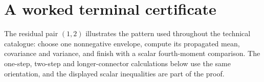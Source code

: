 \section{A worked terminal certificate}\label{app:worked}
The residual pair $(1,2)$ illustrates the pattern used throughout the
technical catalogue: choose one nonnegative envelope, compute its
propagated mean, covariance and variance, and finish with a scalar
fourth-moment comparison. The one-step, two-step and longer-connector
calculations below use the same orientation, and the displayed scalar
inequalities are part of the proof.

